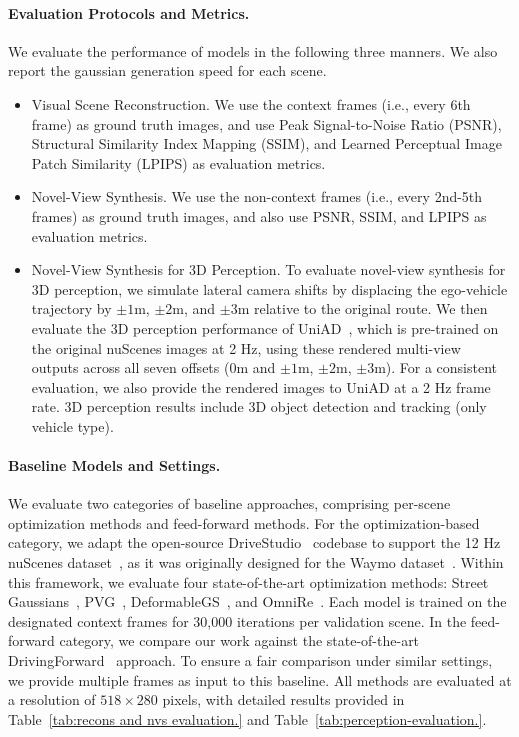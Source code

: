 \paragraph{Evaluation Protocols and Metrics.}
We evaluate the performance of models in the following three manners. We also report the gaussian generation speed for each scene.
\begin{itemize}[leftmargin=9pt]
    \item Visual Scene Reconstruction. We use the context frames (i.e., every 6th frame) as ground truth images, and use Peak Signal-to-Noise Ratio (PSNR), Structural Similarity Index Mapping (SSIM), and Learned Perceptual Image Patch Similarity (LPIPS) as evaluation metrics.
    \item Novel-View Synthesis. We use the non-context frames (i.e., every 2nd-5th frames) as ground truth images, and also use PSNR, SSIM, and LPIPS as evaluation metrics.
    \item Novel-View Synthesis for 3D Perception. To evaluate novel-view synthesis for 3D perception, we simulate lateral camera shifts by displacing the ego-vehicle trajectory by $\pm 1$m, $\pm 2$m, and $\pm 3$m relative to the original route. We then evaluate the 3D perception performance of UniAD~\cite{hu2023planning}, which is pre-trained on the original nuScenes images at 2 Hz, using these rendered multi-view outputs across all seven offsets ($0$m and $\pm 1$m, $\pm 2$m, $\pm 3$m). For a consistent evaluation, we also provide the rendered images to UniAD at a 2 Hz frame rate. 3D perception results include 3D object detection and tracking (only vehicle type).
\end{itemize}

\paragraph{Baseline Models and Settings.}
We evaluate two categories of baseline approaches, comprising per-scene optimization methods and feed-forward methods. For the optimization-based category, we adapt the open-source DriveStudio~\cite{chen2025omnire} codebase to support the 12 Hz nuScenes dataset~\cite{caesar2020nuscenes}, as it was originally designed for the Waymo dataset~\cite{sun2020scalability}. Within this framework, we evaluate four state-of-the-art optimization methods: Street Gaussians~\cite{yan2024street}, PVG~\cite{chen2023periodic}, DeformableGS~\cite{yang2024deformable}, and OmniRe~\cite{chen2025omnire}. Each model is trained on the designated context frames for 30,000 iterations per validation scene. In the feed-forward category, we compare our work against the state-of-the-art DrivingForward~\cite{tian2025drivingforward} approach. To ensure a fair comparison under similar settings, we provide multiple frames as input to this baseline. All methods are evaluated at a resolution of $518 \times 280$ pixels, with detailed results provided in Table~\ref{tab:recons and nvs evaluation.} and Table~\ref{tab:perception-evaluation.}.

